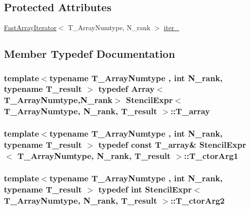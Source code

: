 \subsection*{Protected Attributes}
\begin{DoxyCompactItemize}
\item 
\hyperlink{classFastArrayIterator}{Fast\+Array\+Iterator}$<$ T\+\_\+\+Array\+Numtype, N\+\_\+rank $>$ \hyperlink{classStencilExpr_a6b95b9fe43853c84b71550ea5c38cf35}{iter\+\_\+}
\end{DoxyCompactItemize}


\subsection{Member Typedef Documentation}
\hypertarget{classStencilExpr_a9a5d9a852bd72220519a7042927dc7c1}{}
\subsubsection[{T\+\_\+array}]{\setlength{\rightskip}{0pt plus 5cm}template$<$typename T\+\_\+\+Array\+Numtype , int N\+\_\+rank, typename T\+\_\+result $>$ typedef {\bf Array}$<$T\+\_\+\+Array\+Numtype,N\+\_\+rank$>$ {\bf Stencil\+Expr}$<$ T\+\_\+\+Array\+Numtype, N\+\_\+rank, T\+\_\+result $>$\+::{\bf T\+\_\+array}}\label{classStencilExpr_a9a5d9a852bd72220519a7042927dc7c1}
\hypertarget{classStencilExpr_a7b74609a8262d29ae782a68e38d5fcbb}{}
\subsubsection[{T\+\_\+ctor\+Arg1}]{\setlength{\rightskip}{0pt plus 5cm}template$<$typename T\+\_\+\+Array\+Numtype , int N\+\_\+rank, typename T\+\_\+result $>$ typedef const {\bf T\+\_\+array}\& {\bf Stencil\+Expr}$<$ T\+\_\+\+Array\+Numtype, N\+\_\+rank, T\+\_\+result $>$\+::{\bf T\+\_\+ctor\+Arg1}}\label{classStencilExpr_a7b74609a8262d29ae782a68e38d5fcbb}
\hypertarget{classStencilExpr_a2a9f30c710f6dece525d1890808b68f2}{}
\subsubsection[{T\+\_\+ctor\+Arg2}]{\setlength{\rightskip}{0pt plus 5cm}template$<$typename T\+\_\+\+Array\+Numtype , int N\+\_\+rank, typename T\+\_\+result $>$ typedef int {\bf Stencil\+Expr}$<$ T\+\_\+\+Array\+Numtype, N\+\_\+rank, T\+\_\+result $>$\+::{\bf T\+\_\+ctor\+Arg2}}\label{classStencilExpr_a2a9f30c710f6dece525d1890808b68f2}
\hypertarget{classStencilExpr_a82c2e4135f1f023270a530fd3d08d5c3}{}
